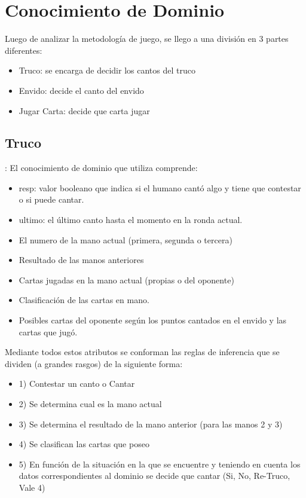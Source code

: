 \documentclass[12pt,a4paper]{article}
\begin{document}
\section{Conocimiento de Dominio}
Luego de analizar la metodolog\'ia de juego, se llego a una divisi\'on en 3 partes diferentes:
\begin{itemize}
\item Truco: se encarga de decidir los cantos del truco
\item Envido: decide el canto del envido
\item Jugar Carta: decide que carta jugar
\end{itemize}
 

\subsection{Truco}:
El conocimiento de dominio que utiliza comprende:
\begin{itemize}
\item resp: valor booleano que indica si el humano cantó algo y tiene que contestar o si puede cantar.
\item ultimo: el último canto hasta el momento en la ronda actual.
\item El numero de la mano actual (primera, segunda o tercera)
\item Resultado de las manos anteriores
\item Cartas jugadas en la mano actual (propias o del oponente)
\item Clasificación de las cartas en mano.
\item Posibles cartas del oponente según los puntos cantados en el envido y las cartas que jugó.
\end{itemize}

Mediante todos estos atributos se conforman las reglas de inferencia que se dividen (a grandes rasgos) de la 
siguiente forma:

\begin{itemize}
\item 1) Contestar un canto o Cantar
\item 2) Se determina cual es la mano actual
\item 3) Se determina el resultado de la mano anterior (para las manos 2 y 3)
\item 4) Se clasifican las cartas que poseo
\item 5) En función de la situación en la que se encuentre y teniendo en cuenta los datos correspondientes al dominio
	   se decide que cantar (Si, No, Re-Truco, Vale 4)
\end{itemize}
\end{document}
